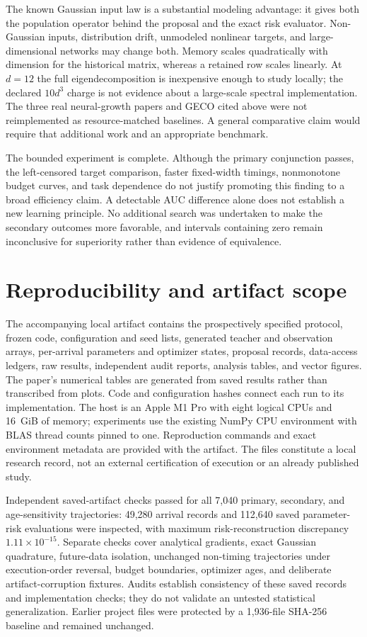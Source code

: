 \documentclass[10pt]{article}
\begin{document}
The known Gaussian input law is a substantial modeling advantage:
it gives both the population operator behind the proposal and the
exact risk evaluator. Non-Gaussian inputs, distribution drift,
unmodeled nonlinear targets, and large-dimensional networks may
change both. Memory scales quadratically with dimension for the
historical matrix, whereas a retained row scales linearly. At $d=12$
the full eigendecomposition is inexpensive enough to study locally;
the declared $10d^3$ charge is not evidence about a large-scale
spectral implementation. The three real neural-growth papers and
GECO cited above were not reimplemented as resource-matched
baselines. A general comparative claim would require that additional
work and an appropriate benchmark.

The bounded experiment is complete. Although the primary conjunction
passes, the left-censored target comparison, faster fixed-width
timings, nonmonotone budget curves, and task dependence do not justify
promoting this finding to a broad efficiency claim. A detectable AUC
difference alone does not establish a new learning principle. No
additional search was undertaken to make the secondary outcomes
more favorable, and intervals containing zero remain inconclusive
for superiority rather than evidence of equivalence.

\section{Reproducibility and artifact scope}

The accompanying local artifact contains the prospectively specified
protocol, frozen code, configuration and seed lists, generated teacher
and observation arrays, per-arrival parameters and optimizer states,
proposal records, data-access ledgers, raw results, independent audit
reports, analysis tables, and vector figures. The paper's numerical
tables are generated from saved results rather than transcribed from
plots. Code and configuration hashes connect each run to its
implementation. The host is an Apple M1 Pro with eight logical CPUs
and 16~GiB of memory; experiments use the existing NumPy CPU
environment with BLAS thread counts pinned to one. Reproduction
commands and exact environment metadata are provided with the
artifact. The files constitute a local research record, not an
external certification of execution or an already published study.

Independent saved-artifact checks passed for all 7,040 primary,
secondary, and age-sensitivity trajectories: 49,280 arrival records
and 112,640 saved parameter-risk evaluations were inspected, with
maximum risk-reconstruction discrepancy $1.11\times10^{-15}$.
Separate checks cover analytical gradients, exact Gaussian quadrature,
future-data isolation, unchanged non-timing trajectories under
execution-order reversal, budget boundaries, optimizer ages, and
deliberate artifact-corruption fixtures. Audits establish consistency
of these saved records and implementation checks; they do not
validate an untested statistical generalization. Earlier project
files were protected by a 1,936-file SHA-256 baseline and remained
unchanged.
\end{document}
